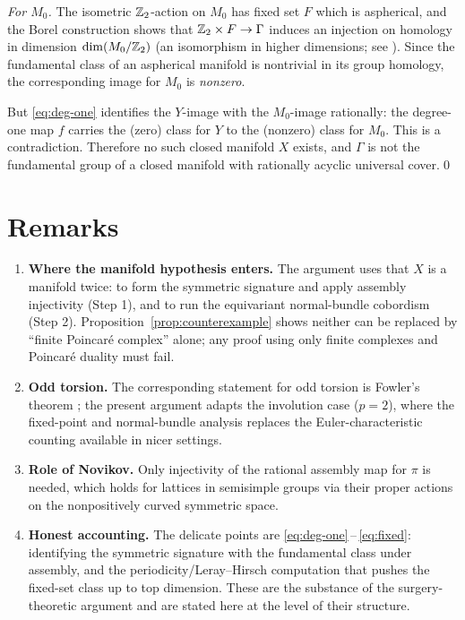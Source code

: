 \documentclass[11pt]{article}
\begin{document}
\emph{For $M_0$.} The isometric $\mathbb{Z}_2$-action on $M_0$ has fixed set $F$ which is
aspherical, and the Borel construction shows that
$\mathbb{Z}_2\times F\to\Gamma$ induces an injection on homology in dimension
$\dim(M_0/\mathbb{Z}_2)$ (an isomorphism in higher dimensions; see \cite{Borel}). Since
the fundamental class of an aspherical manifold is nontrivial in its group
homology, the corresponding image for $M_0$ is \emph{nonzero}.

But \eqref{eq:deg-one} identifies the $Y$-image with the $M_0$-image rationally:
the degree-one map $f$ carries the (zero) class for $Y$ to the (nonzero) class
for $M_0$. This is a contradiction. Therefore no such closed manifold $X$
exists, and $\Gamma$ is not the fundamental group of a closed manifold with
rationally acyclic universal cover.\qed

\section*{Remarks}

\begin{enumerate}\setlength\itemsep{4pt}
\item \textbf{Where the manifold hypothesis enters.} The argument uses that $X$
is a manifold twice: to form the symmetric signature and apply assembly
injectivity (Step 1), and to run the equivariant normal-bundle cobordism (Step
2). Proposition~\ref{prop:counterexample} shows neither can be replaced by
``finite Poincar\'e complex'' alone; any proof using only finite complexes and
Poincar\'e duality must fail.
\item \textbf{Odd torsion.} The corresponding statement for odd torsion is
Fowler's theorem \cite{W2}; the present argument adapts the involution case
($p=2$), where the fixed-point and normal-bundle analysis replaces the
Euler-characteristic counting available in nicer settings.
\item \textbf{Role of Novikov.} Only injectivity of the rational assembly map
for $\pi$ is needed, which holds for lattices in semisimple groups via their
proper actions on the nonpositively curved symmetric space.
\item \textbf{Honest accounting.} The delicate points are
\eqref{eq:deg-one}\,--\,\eqref{eq:fixed}: identifying the symmetric signature with
the fundamental class under assembly, and the periodicity/Leray--Hirsch
computation that pushes the fixed-set class up to top dimension. These are the
substance of the surgery-theoretic argument and are stated here at the level of
their structure.
\end{enumerate}
\end{document}
